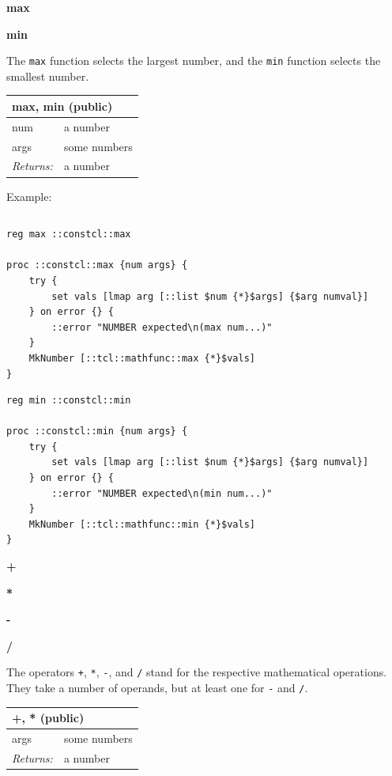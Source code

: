 \documentclass[twoside,9pt]{report}
\begin{document}
\textbf{max}


\textbf{min}


The \texttt{max} function selects the largest number, and the \texttt{min} function selects the smallest number.

\begin{tabular}{ |l l| }
\hline
\multicolumn{2}{|l|}{max, min (public)} \\
\hline
num & a number \\
args & some numbers \\
\textit{Returns:} & a number \\
\hline
\end{tabular}


Example:

\noindent\makebox[\linewidth]{\rule{\linewidth}{0.4pt}}
\begin{lstlisting}
\end{lstlisting}
\noindent\makebox[\linewidth]{\rule{\linewidth}{0.4pt}}
\noindent\makebox[\linewidth]{\rule{\linewidth}{0.4pt}}
\begin{lstlisting}
reg max ::constcl::max
 
proc ::constcl::max {num args} {
    try {
        set vals [lmap arg [::list $num {*}$args] {$arg numval}]
    } on error {} {
        ::error "NUMBER expected\n(max num...)"
    }
    MkNumber [::tcl::mathfunc::max {*}$vals]
}
\end{lstlisting}
\noindent\makebox[\linewidth]{\rule{\linewidth}{0.4pt}}
\noindent\makebox[\linewidth]{\rule{\linewidth}{0.4pt}}
\begin{lstlisting}
reg min ::constcl::min
 
proc ::constcl::min {num args} {
    try {
        set vals [lmap arg [::list $num {*}$args] {$arg numval}]
    } on error {} {
        ::error "NUMBER expected\n(min num...)"
    }
    MkNumber [::tcl::mathfunc::min {*}$vals]
}
\end{lstlisting}
\noindent\makebox[\linewidth]{\rule{\linewidth}{0.4pt}}

\textbf{+}


\textbf{*}


\textbf{-}


\textbf{/}


The operators \texttt{+}, \texttt{*}, \texttt{-}, and \texttt{/} stand for the respective mathematical operations. They take a number of operands, but at least one for \texttt{-} and \texttt{/}.

\begin{tabular}{ |l l| }
\hline
\multicolumn{2}{|l|}{+, * (public)} \\
\hline
args & some numbers \\
\textit{Returns:} & a number \\
\hline
\end{tabular}
\end{document}
